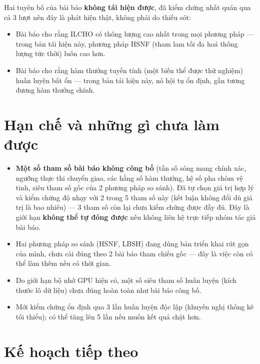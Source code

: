 \documentclass[12pt,a4paper]{article}
\begin{document}
Hai tuyên bố của bài báo \textbf{không tái hiện được}, đã kiểm chứng nhất quán qua cả 3 lượt
nên đây là phát hiện thật, không phải do thiếu sót:

\begin{itemize}[leftmargin=1.2em]
  \item Bài báo cho rằng ILCHO có thông lượng cao nhất trong mọi phương pháp — trong bản tái
        hiện này, phương pháp HSNF (tham lam tối đa hoá thông lượng tức thời) luôn cao hơn.
  \item Bài báo cho rằng hàm thưởng tuyến tính (một biến thể được thử nghiệm) huấn luyện bất
        ổn — trong bản tái hiện này, nó hội tụ ổn định, gần tương đương hàm thưởng chính.
\end{itemize}

\section{Hạn chế và những gì chưa làm được}

\begin{itemize}[leftmargin=1.2em]
  \item \textbf{Một số tham số bài báo không công bố} (tần số sóng mang chính xác, ngưỡng
        thực thi chuyển giao, các hằng số hàm thưởng, hệ số pha chòm vệ tinh, siêu tham số
        gốc của 2 phương pháp so sánh). Đã tự chọn giá trị hợp lý và kiểm chứng độ nhạy với
        2 trong 5 tham số này (kết luận không đổi dù giá trị là bao nhiêu) — 3 tham số còn lại
        chưa kiểm chứng được đầy đủ. Đây là giới hạn \textbf{không thể tự đóng được} nếu không
        liên hệ trực tiếp nhóm tác giả bài báo.
  \item Hai phương pháp so sánh (HSNF, LBSH) đang dùng bản triển khai rút gọn của mình, chưa
        cài đúng theo 2 bài báo tham chiếu gốc — đây là việc còn có thể làm thêm nếu có thời
        gian.
  \item Do giới hạn bộ nhớ GPU hiện có, một số siêu tham số huấn luyện (kích thước lô dữ liệu)
        chưa đúng hoàn toàn như bài báo công bố.
  \item Mới kiểm chứng ổn định qua 3 lần huấn luyện độc lập (khuyến nghị thống kê tối thiểu);
        có thể tăng lên 5 lần nếu muốn kết quả chặt hơn.
\end{itemize}

\section{Kế hoạch tiếp theo}
\end{document}
